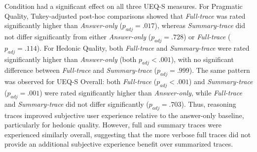 \documentclass[acmlarge,review=true, anonymous=true]{acmart}
\begin{document}
Condition had a significant effect on all three UEQ-S measures. For Pragmatic Quality, Tukey-adjusted post-hoc comparisons showed that \textit{Full-trace} was rated significantly higher than \textit{Answer-only} ($p_{adj} = .017$), whereas \textit{Summary-trace} did not differ significantly from either \textit{Answer-only} ($p_{adj} = .728$) or \textit{Full-trace} ($p_{adj} = .114$). For Hedonic Quality, both \textit{Full-trace} and \textit{Summary-trace} were rated significantly higher than \textit{Answer-only} (both $p_{adj} < .001$), with no significant difference between \textit{Full-trace} and \textit{Summary-trace} ($p_{adj} = .999$). The same pattern was observed for UEQ-S Overall: both \textit{Full-trace} ($p_{adj} < .001$) and \textit{Summary-trace} ($p_{adj} = .001$) were rated significantly higher than \textit{Answer-only}, while \textit{Full-trace} and \textit{Summary-trace} did not differ significantly ($p_{adj} = .703$).
Thus, reasoning traces improved subjective user experience relative to the answer-only baseline, particularly for hedonic quality. However, full and summary traces were experienced similarly overall, suggesting that the more verbose full traces did not provide an additional subjective experience benefit over summarized traces.
\end{document}
